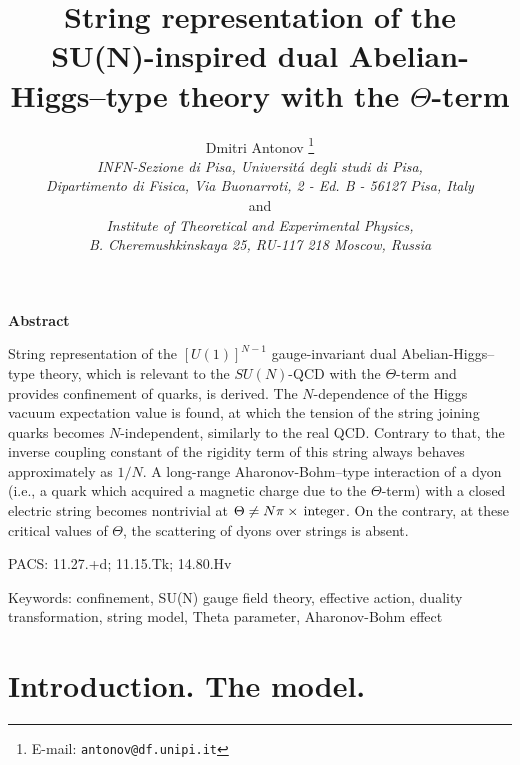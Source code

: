 \documentclass[a4paper,12pt]{article}
\title{
\vspace{-3mm}
\rightline{\small IFUP-TH 2002/27}
\vspace{8mm}
\bf String representation of the SU(N)-inspired dual Abelian-Higgs--type theory with the $\Theta$-term}
\author{Dmitri Antonov
\thanks{E-mail: {\tt antonov@df.unipi.it}}
\\
{\it INFN-Sezione di Pisa, Universit\'a degli studi di Pisa,}\\
{\it Dipartimento di Fisica, Via Buonarroti, 2 - Ed. B - 56127 Pisa, Italy}\\
and\\
{\it Institute of Theoretical and Experimental Physics,}\\
{\it B. Cheremushkinskaya 25, RU-117 218 Moscow, Russia}}
\date{}
\begin{document}
\maketitle
\vspace{1mm}
\centerline{\bf {Abstract}}
\vspace{3mm}
\noindent
String representation of the $[U(1)]^{N-1}$ gauge-invariant
dual Abelian-Higgs--type theory, which is relevant to the $SU(N)$-QCD
with the $\Theta$-term and provides confinement of quarks, is derived.
The $N$-dependence of the Higgs vacuum expectation value is found, at which
the tension of the string joining quarks becomes $N$-independent, similarly to the real QCD. Contrary to that,
the inverse coupling constant of the rigidity term of this string always behaves approximately as $1/N$.
A long-range Aharonov-Bohm--type interaction of a dyon (i.e., a quark which acquired a magnetic charge
due to the $\Theta$-term) with a closed electric string becomes nontrivial at
$\Theta\ne N\pi\times{\,}{\rm integer}$. On the contrary, at these critical values of $\Theta$,
the scattering of dyons over strings is absent.


\vspace{3mm}
\noindent
PACS: 11.27.+d; 11.15.Tk; 14.80.Hv

\vspace{3mm}
\noindent
Keywords: confinement, SU(N) gauge field theory, effective action, duality transformation, string model, Theta parameter,
Aharonov-Bohm effect

\newpage

\section{Introduction. The model.}
\end{document}
